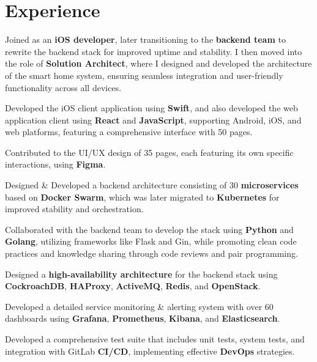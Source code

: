 \documentclass[letterpaper]{deedy-resume} %
\begin{document}
\hfill
%
%
\begin{minipage}[t]{0.66\textwidth} %


\section{Experience}


\vspace{\topsep} %
\begin{tightitemize}
\item Joined as an {\bf iOS developer}, later transitioning to the {\bf backend team} to rewrite the backend stack for improved uptime and stability. I then moved into the role of {\bf Solution Architect}, where I designed and developed the architecture of the smart home system, ensuring seamless integration and user-friendly functionality across all devices.
\item Developed the iOS client application using {\bf Swift}, and also developed the web application client using {\bf React} and {\bf JavaScript}, supporting Android, iOS, and web platforms, featuring a comprehensive interface with 50 pages.
\item Contributed to the UI/UX design of 35 pages, each featuring its own specific interactions, using {\bf Figma}.
\item Designed \& Developed a backend architecture consisting of 30 {\bf microservices} based on {\bf Docker Swarm}, which was later migrated to {\bf Kubernetes} for improved stability and orchestration.
\item Collaborated with the backend team to develop the stack using {\bf Python} and {\bf Golang}, utilizing frameworks like Flask and Gin, while promoting clean code practices and knowledge sharing through code reviews and pair programming.
\item Designed a {\bf high-availability architecture} for the backend stack using {\bf CockroachDB}, {\bf HAProxy}, {\bf ActiveMQ}, {\bf Redis}, and {\bf OpenStack}.
\item Developed a detailed service monitoring \& alerting system with over 60 dashboards using {\bf Grafana}, {\bf Prometheus}, {\bf Kibana}, and {\bf Elasticsearch}.
\item Developed a comprehensive test suite that includes unit tests, system tests, and integration with GitLab {\bf CI/CD}, implementing effective {\bf DevOps} strategies.


\end{tightitemize}
\end{minipage}
\end{document}
